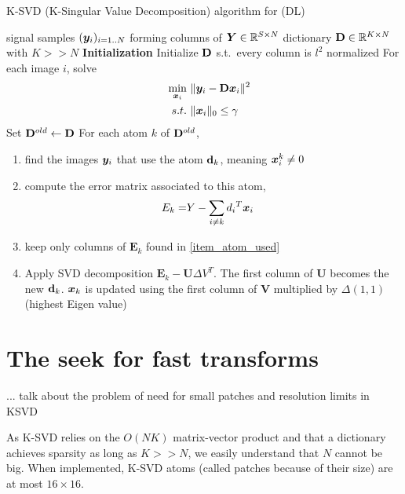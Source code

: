 \begin{algorithm}
    \caption{K-SVD (K-Singular Value Decomposition) algorithm for (DL)}
  \begin{algorithmic}[0]
    \Input signal samples $(\bm{y}_i)_{i=1..N}$ forming columns of $\bm{Y} \in \mathbb{R}^{S \times N}$
    \Output dictionary $\mathbf D \in \mathbb{R}^{K \times N}$ with $K>>N$
    \State \textbf{Initialization} Initialize $\mathbf D$ s.t.~every column is $l^2$ normalized
	\State For each image $i$, solve 
		\begin{align}
			\quad \min_{\bm x_i}~ & \lVert \bm{y}_i-\mathbf D\bm x_i\rVert^2\\
			s.t.~& \lVert \bm x_i \rVert_0 \le \gamma \notag
		\end{align}
	\State Set $\mathbf D^{old} \leftarrow \mathbf D$
	\State For each atom $k$ of $\mathbf D^{old}$, 
	\begin{enumerate}[leftmargin=15mm,label=(\alph*)]
		\item find the images $\bm{y}_i$ that use the atom $\mathbf d_k$, meaning $\bm x_i^k \ne 0$ \label{item_atom_used}
		\item compute the error matrix associated to this atom,
		\begin{align}
			E_k =& Y-\sum_{i\ne k} {d_i}^T\bm x_i
		\end{align}
		\item keep only columns of $\bm{E}_k$ found in \ref{item_atom_used}
		\item Apply SVD decomposition $\bm{E}_k - \bm{U} \Delta V^T$. The first column of $\bm{U}$ becomes the new $\mathbf d_k$. $\bm x_k$ is updated using the first column of $\bm{V}$ multiplied by $\Delta(1,1)$ (highest Eigen value)
	\end{enumerate}
    \EndWhile
  \end{algorithmic}
\end{algorithm}
\section{The seek for fast transforms}

... talk about the problem of need for small patches and resolution limits in KSVD %

As K-SVD relies on the $O(NK)$ matrix-vector product and that a dictionary achieves sparsity as long as $K >> N$, we easily understand that $N$ cannot be big. When implemented, K-SVD atoms (called patches because of their size) are at most $16 \times 16$.

